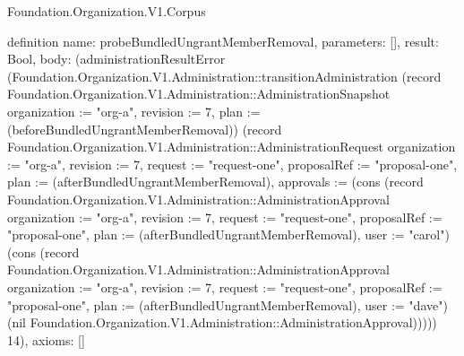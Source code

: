 \begin{lexlean}{Foundation.Organization.V1.Corpus}
\begin{semanticmodule}
definition{
  name: probeBundledUngrantMemberRemoval,
  parameters: [],
  result: Bool,
  body: (administrationResultError (Foundation.Organization.V1.Administration::transitionAdministration (record Foundation.Organization.V1.Administration::AdministrationSnapshot {organization := "org-a", revision := 7, plan := (beforeBundledUngrantMemberRemoval)}) (record Foundation.Organization.V1.Administration::AdministrationRequest {organization := "org-a", revision := 7, request := "request-one", proposalRef := "proposal-one", plan := (afterBundledUngrantMemberRemoval), approvals := (cons (record Foundation.Organization.V1.Administration::AdministrationApproval {organization := "org-a", revision := 7, request := "request-one", proposalRef := "proposal-one", plan := (afterBundledUngrantMemberRemoval), user := "carol"}) (cons (record Foundation.Organization.V1.Administration::AdministrationApproval {organization := "org-a", revision := 7, request := "request-one", proposalRef := "proposal-one", plan := (afterBundledUngrantMemberRemoval), user := "dave"}) (nil Foundation.Organization.V1.Administration::AdministrationApproval)))})) 14),
  axioms: []
}


\end{semanticmodule}
\end{lexlean}
